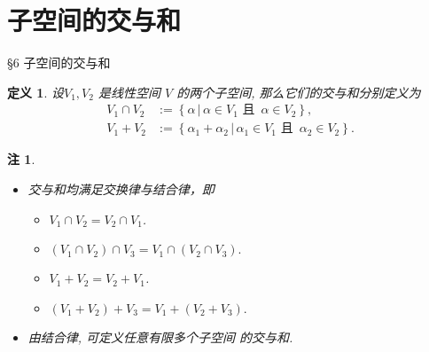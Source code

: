 \documentclass[13pt]{beamer}
\newtheorem*{defi}{定义}
\newtheorem*{rem}{注}
\begin{document}
\section{子空间的交与和}
\begin{frame}{\S 6 子空间的交与和}
\begin{defi}
设$V_1, V_2$ 是线性空间 $V$ 的两个子空间,
那么它们的交与和分别定义为
\begin{align*}
V_{1} \cap V_{2} & :=\left\{\alpha\, | \, \alpha \in V_{1} \text { 且 }\,  \alpha \in V_{2}\right\},\\
V_{1}+V_{2} & :=\left\{\alpha_{1}+\alpha_{2} \, | \, \alpha_{1} \in V_{1} \text { 且 }\,  \alpha_{2} \in V_{2}\right\}.
\end{align*}
\end{defi}
\end{frame}


\begin{frame}
\begin{rem}
\begin{itemize}
\item 交与和均满足交换律与结合律，即
\begin{itemize}
\item  $V_{1} \cap V_{2}=V_{2} \cap V_{1}$.
\item  $\left(V_{1} \cap V_{2}\right) \cap V_{3}=V_{1} \cap\left(V_{2} \cap V_{3}\right).$
\item  $V_{1}+V_{2}=V_{2}+V_{1}$.
\item  $\left(V_{1}+V_{2}\right)+V_{3}=V_{1}+\left(V_{2}+V_{3}\right).$
\end{itemize}
\item 由结合律, 可定义任意有限多个子空间 的交与和.
\end{itemize}
\end{rem}
\end{frame}
\end{document}
